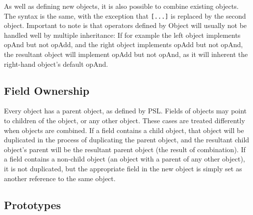 As well as defining new objects, it is also possible to combine existing objects. The syntax is the same, with the exception that \texttt{[...]} is replaced by the second object. Important to note is that operators defined by Object will usually not be handled well by multiple inheritance: If for example the left object implements opAnd but not opAdd, and the right object implements opAdd but not opAnd, the resultant object will implement opAdd but not opAnd, as it will inherent the right-hand object's default opAnd.



\subsection{Field Ownership}

Every object has a parent object, as defined by PSL. Fields of objects may point to children of the object, or any other object. These cases are treated differently when objects are combined. If a field contains a child object, that object will be duplicated in the process of duplicating the parent object, and the resultant child object's parent will be the resultant parent object (the result of combination). If a field contains a non-child object (an object with a parent of any other object), it is not duplicated, but the appropriate field in the new object is simply set as another reference to the same object.



\subsection{Prototypes}

